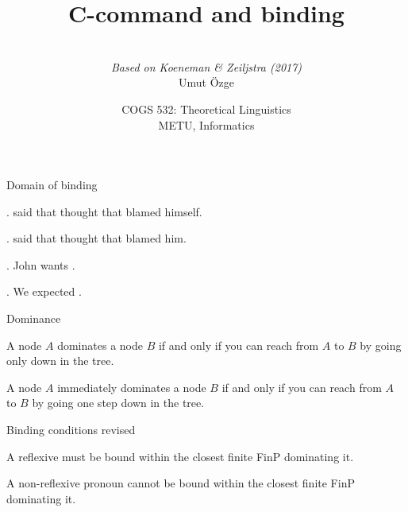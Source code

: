 \documentclass[ignorenonframetext,10pt,aspectratio=169]{beamer}
\title{C-command and binding}
\author{\  \\  {\it Based on Koeneman \& Zeiljstra (2017)} \\ \vspace{20pt} Umut \"Ozge\\  }
\date{COGS 532: Theoretical Linguistics\\ METU, Informatics}
\begin{document}
\begin{frame}\frametitle{}
\thispagestyle{empty}
\maketitle
\end{frame}

\begin{frame}[t,plain]{Domain of binding}

		\bigskip

		\ex.  said that  thought that  blamed himself.

		\bigskip

		\ex.  said that  thought that  blamed him.

		\bigskip

		\ex. John wants . 

		\bigskip

		\ex. We expected . 

\end{frame}


\begin{frame}[t,plain]{Dominance}

		\bigskip

		A node $A$ \alert{dominates} a node $B$ if and only if you can reach from $A$ to $B$ by going \alert{only down} in the tree. 

		\bigskip


		A node $A$ \alert{immediately dominates} a node $B$ if and only if you can reach from $A$ to $B$ by going \alert{one step down} in the tree. 

\end{frame}

\begin{frame}[t,plain]{Binding conditions revised}
		\bigskip
		\bigskip
		\bigskip


		A reflexive must be bound within the closest \alert{finite} FinP dominating it.

		\bigskip


		A non-reflexive pronoun cannot be bound within the closest \alert{finite} FinP dominating it.

\end{frame}
\end{document}

